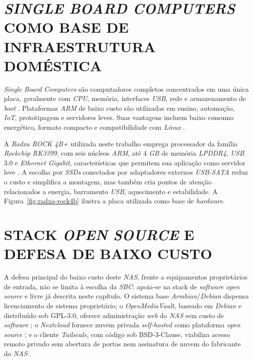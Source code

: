 \section{\textit{SINGLE BOARD COMPUTERS} COMO BASE DE INFRAESTRUTURA DOMÉSTICA}

\textit{Single Board Computers} são computadores completos concentrados em uma única placa, geralmente com \textit{CPU}, memória, interfaces \textit{USB}, rede e armazenamento de \textit{boot} \cite{upton2016}. Plataformas \textit{ARM} de baixo custo são utilizadas em ensino, automação, \textit{IoT}, prototipagem e servidores leves. Suas vantagens incluem baixo consumo energético, formato compacto e compatibilidade com \textit{Linux} \cite{johnston2018}.

A \textit{Radxa ROCK 4B+} utilizada neste trabalho emprega processador da família \textit{Rockchip RK3399}, com seis núcleos \textit{ARM}, até 4 \textit{GB} de memória \textit{LPDDR4}, \textit{USB} 3.0 e \textit{Ethernet Gigabit}, características que permitem sua aplicação como servidor leve \cite{radxa2026}. A escolha por \textit{SSDs} conectados por adaptadores externos \textit{USB-SATA} reduz o custo e simplifica a montagem, mas também cria pontos de atenção relacionados a energia, barramento \textit{USB}, aquecimento e estabilidade. A Figura~\ref{fig:radxa-rock4b} ilustra a placa utilizada como base de \textit{hardware}.

\begin{figure}[H]
    \centering
\end{figure}

\section{STACK \textit{OPEN SOURCE} E DEFESA DE BAIXO CUSTO}

A defesa principal do baixo custo deste \textit{NAS}, frente a equipamentos proprietários de entrada, não se limita à escolha da \textit{SBC}: apoia-se na stack de \textit{software open source} e livre já descrita neste capítulo. O sistema base \textit{Armbian}/\textit{Debian} dispensa licenciamento de sistema proprietário; o \textit{OpenMediaVault}, baseado em \textit{Debian} e distribuído sob GPL-3.0, oferece administração \textit{web} do \textit{NAS} sem custo de \textit{software} \cite{openmediavault2026,omvlicensing2026}; o \textit{Nextcloud} fornece nuvem privada \textit{self-hosted} como plataforma \textit{open source} \cite{nextcloud2026}; e o cliente \textit{Tailscale}, com código sob BSD-3-Clause, viabiliza acesso remoto privado sem abertura de portas nem assinatura de nuvem do fabricante do \textit{NAS} \cite{tailscalebsd2026,tailscale2026,tailscalehowworks}.

